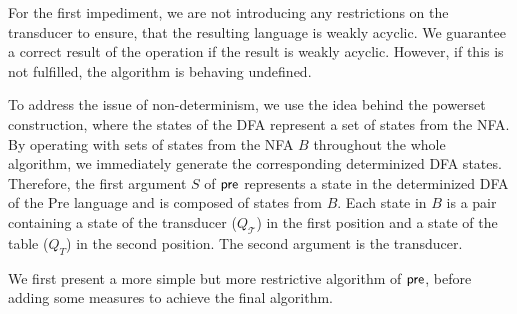 \par

For the first impediment, we are not introducing any restrictions on the transducer to ensure, that the resulting language is weakly acyclic. We guarantee a correct result of the operation if the result is weakly acyclic. However, if this is not fulfilled, the algorithm is behaving undefined. 

\par

To address the issue of non-determinism, we use the idea behind the powerset construction, where the states of the DFA represent a set of states from the NFA. By operating with sets of 
states from the NFA $B$ throughout the whole algorithm, we immediately generate the corresponding determinized DFA states.
Therefore, the first argument $S$ of $\operatorname{\textsf{pre}}$ represents a state in the determinized DFA of the Pre language and is composed of states from $B$.  
Each state in $B$ is a pair containing a state of the transducer ($Q_{\mathcal{T}}$) in the first position and a state of the table ($Q_{T}$) in the second position. The second argument is the transducer.

\par

We first present a more simple but more restrictive algorithm of $\operatorname{\textsf{pre}}$, before adding some measures to achieve the final algorithm.

\par 


